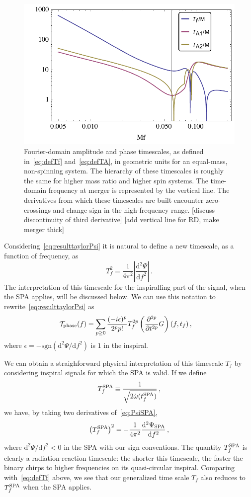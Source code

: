\documentclass[aps,showpacs,twocolumn,
prd,superscriptaddress,nofootinbib]{revtex4-1}
\newcommand{\be}{\begin{equation}}
\newcommand{\ee}{\end{equation}}
\newcommand\ud{{\mathrm{d}}}
\newcommand\calT{{\mathcal{T}}}
\newcommand{\tf}{t_{f}}
\newcommand{\Tf}{T_{f}}
\newcommand{\tfSPA}{t_{f}^{\rm SPA}}
\newcommand{\SM}[1]{{\color{Red} #1}}
\begin{document}
\begin{figure}
  \centering
  \includegraphics[width=.99\linewidth]{plots/TfTA.pdf}
  \caption{Fourier-domain amplitude and phase timescales, as defined in~\eqref{eq:defTf} and~\eqref{eq:defTA}, in geometric units for an equal-mass, non-spinning system. The hierarchy of these timescales is roughly the same for higher mass ratio and higher spin systems. The time-domain frequency at merger is represented by the vertical line. The derivatives from which these timescales are built encounter zero-crossings and change sign in the high-frequency range. \SM{[discuss discontinuity of third derivative]}\SM{[add vertical line for RD, make merger thick]}}
  \label{fig:TfTA}
\end{figure}

Considering~\eqref{eq:resulttaylorPsi} it is natural to define a new timescale, as a function of frequency, as
\be\label{eq:defTf}
	\Tf^{2} = \frac{1}{4\pi^{2}}\left| \frac{\ud^{2}\Psi}{\ud f^{2}} \right| \,.
\ee
The interpretation of this timescale for the inspiralling part of the signal, when the SPA applies, will be discussed below. We can use this notation to rewrite~\eqref{eq:resulttaylorPsi} as
\begin{align}\label{eq:resultdffPsiTf}
	 \calT_{\rm phase}(f) &= \sum\limits_{p\geq 0} \frac{(-i\epsilon)^{p}}{2^{p}p!} \Tf^{2p} \left( \frac{\partial^{2p} }{\partial t^{2p}} G \right)(f, \tf) \,,
\end{align}
where $\epsilon = -\mathrm{sgn}(\ud^{2}\Psi/\ud f^{2} )$ is $1$ in the inspiral.

We can obtain a straighforward physical interpretation of this timescale $\Tf$ by considering inspiral signals for which the SPA is valid. If we define
\be\label{eq:TfSPA}
	\Tf^{\rm SPA} \equiv \frac{1}{\sqrt{2\dot{\omega}(\tfSPA)}} \,,
\ee
we have, by taking two derivatives of~\eqref{eq:PsiSPA},
\be
	\left(\Tf^{\rm SPA} \right)^{2} = -\frac{1}{4\pi^{2}}  \frac{\ud^{2} \Psi_{\rm SPA}}{\ud f^{2}} \,,
\ee
where $\ud^{2}\Psi/\ud f^{2} < 0$ in the SPA with our sign conventions. The quantity $\Tf^{\rm SPA}$ is clearly a radiation-reaction timescale: the shorter this timescale, the faster the binary chirps to higher frequencies on its quasi-circular inspiral. Comparing with~\eqref{eq:defTf} above, we see that our generalized time scale $\Tf$ also reduces to $\Tf^{\rm SPA}$ when the SPA applies.
\end{document}
